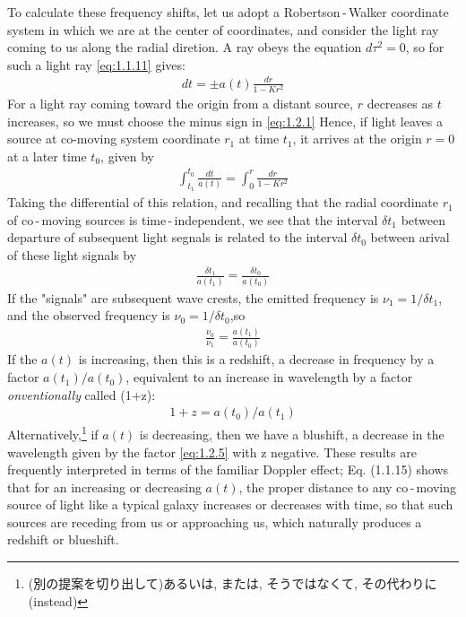 \documentclass[11pt,a4paper,dvipdfmx]{jsarticle}
\theoremstyle{plain}
\theoremstyle{break}
\begin{document}
To calculate these frequency shifts, let us adopt a Robertson\,-\,Walker coordinate system in which we are at the center of coordinates, and consider the light ray coming to us along the radial diretion.
A ray obeys the equation $d\tau^2 = 0$, so for such a light ray \eqref{eq:1.1.11} gives:
\begin{align}
  dt = \pm a(t) \frac{dr}{1- Kr^2} \label{eq:1.2.1}
\end{align}
For a light ray coming toward the origin from a distant source, $r$ decreases as $t$ increases, so we must choose the minus sign in \eqref{eq:1.2.1}
Hence, if light leaves a source at co-moving system coordinate $r_1$ at time $t_1$, it arrives at the origin $r=0$ at a later time $t_0$, given by
\begin{align}
  \int_{t_1}^{t_0}\frac{dt}{a(t)} = \int_{0}^{r} \frac{dr}{1-Kr^2} \label{eq:1.2.2}
\end{align}
Taking the differential of this relation, and recalling that the radial coordinate $r_1$ of co\,-\,moving sources is time\,-\,independent,
we see that the interval $\delta t_1$ between departure of subsequent light segnals is related to the interval $\delta t_0$ between arival of these light signals by
\begin{align}
  \frac{\delta{t_1}}{a(t_1)} =   \frac{\delta{t_0}}{a(t_0)}
\end{align}
If the "signals" are subsequent wave crests, the emitted frequency is $\nu_1 = 1/\delta{t_1}$, and the observed frequency is $\nu_0=1/\delta{t_0}$,so
\begin{align}
  \frac{\nu_0}{\nu_1} = \frac{a(t_1)}{a(t_0)}
\end{align}
If the $a(t)$ is increasing, then this is a redshift, a decrease in frequency by a factor $a(t_1)/a(t_0)$, equivalent to an increase in wavelength by a factor \textit{onventionally} called (1+z):
\begin{align}
  1+z = a(t_0)/a(t_1) \label{eq:1.2.5}
\end{align}
Alternatively,\footnote{(別の提案を切り出して)あるいは, または, そうではなくて, その代わりに(instead) }
if $a(t)$ is decreasing, then we have a blushift, a decrease in the wavelength given by the factor \eqref{eq:1.2.5} with z negative.
These results are frequently interpreted in terms of the familiar Doppler effect; Eq. (1.1.15) shows that for an increasing or decreasing $a(t)$,
 the proper distance to any co\,-\,moving source of light like a typical galaxy increases or decreases with time, so that such sources are receding from us or approaching us, which naturally produces a redshift or blueshift.
\end{document}
